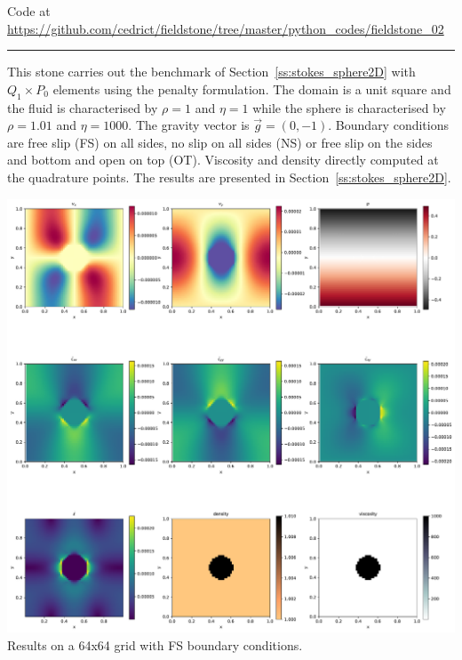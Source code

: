 

\begin{center}
Code at \url{https://github.com/cedrict/fieldstone/tree/master/python_codes/fieldstone_02}
\end{center}

\par\noindent\rule{\textwidth}{0.4pt}

This stone carries out the benchmark of Section~\ref{ss:stokes_sphere2D}
with $Q_1\times P_0$ elements using the penalty formulation.
The domain is a unit square and the fluid is characterised 
by $\rho=1$ and $\eta=1$ 
while the sphere is characterised 
by $\rho=1.01$ and $\eta=1000$.
The gravity vector is $\vec{g}=(0,-1)$. 
Boundary conditions are free slip (FS) on all sides, no slip on all sides (NS)
or free slip on the sides and bottom and open on top (OT).
Viscosity and density directly computed at the quadrature points.
The results are presented in Section~\ref{ss:stokes_sphere2D}.

\begin{center}
\includegraphics[width=15cm]{python_codes/fieldstone_02/solution64FS.pdf}\\
{\captionfont Results on a 64x64 grid with FS boundary conditions.}
\end{center}


